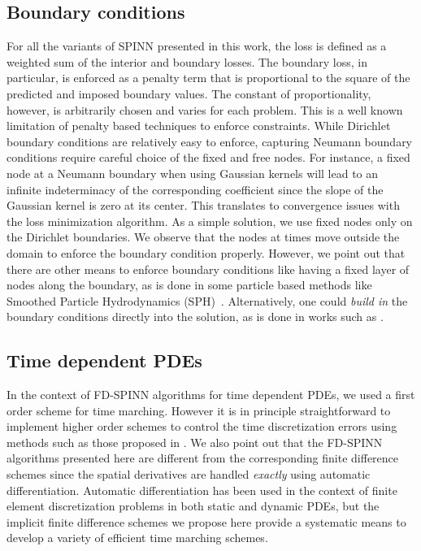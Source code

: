 \documentclass[12pt]{article}
\begin{document}
\subsection{Boundary conditions}
For all the variants of SPINN presented in this work, the loss is defined as a weighted sum of the interior and boundary losses. The boundary loss, in particular, is enforced as a penalty term that is proportional to the square of the predicted and imposed boundary values. The constant of proportionality, however, is arbitrarily chosen and varies for each problem. This is a well known limitation of penalty based techniques to enforce constraints. While Dirichlet boundary conditions are relatively easy to enforce, capturing Neumann boundary conditions require careful choice of the fixed and free nodes. For instance, a fixed node at a Neumann boundary when using Gaussian kernels will lead to an infinite indeterminacy of the corresponding coefficient since the slope of the Gaussian kernel is zero at its center. This translates to convergence issues with the loss minimization algorithm. As a simple solution, we use fixed nodes only on the Dirichlet boundaries. We observe that the nodes at times move outside the domain to enforce the boundary condition properly. However, we point out that there are other means to enforce boundary conditions like having a fixed layer of nodes along the boundary, as is done in some particle based methods like Smoothed Particle Hydrodynamics (SPH)~\cite{ye2019sph}. Alternatively, one could \emph{build in} the boundary conditions directly into the solution, as is done in works such as \cite{BN2018}.

\subsection{Time dependent PDEs}
In the context of FD-SPINN algorithms for time dependent PDEs, we used a first order scheme for time marching. However it is in principle straightforward to implement higher order schemes to control the time discretization errors using methods such as those proposed in \cite{SCL2020pre}. We also point out that the FD-SPINN algorithms presented here are different from the corresponding finite difference schemes since the spatial derivatives are handled \emph{exactly} using automatic differentiation. Automatic differentiation has been used in the context of finite element discretization problems in both static \cite{TRRB2002} and dynamic \cite{RG2014} PDEs, but the implicit finite difference schemes we propose here provide a systematic means to develop a variety of efficient time marching schemes.
\end{document}
